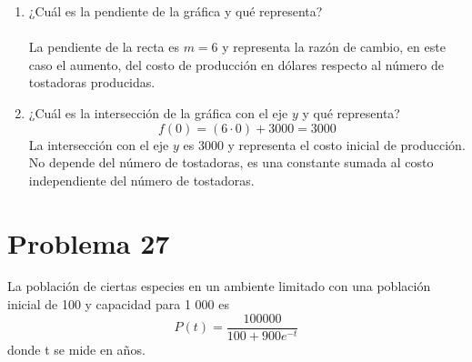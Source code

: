 \documentclass[12pt]{article}
\begin{document}
\begin{enumerate}
\item  ¿Cuál es la pendiente de la gráfica y qué representa?
\\ \\
La pendiente de la recta es $m=6$ y representa la razón de cambio, en este caso el aumento, del costo de producción en dólares respecto al número de tostadoras producidas.
\\  
\item  ¿Cuál es la intersección de la gráfica con el eje $y$ y qué representa?
\\
\[
f(0) = (6 \cdot 0) + 3000 = 3000
\]
La intersección con el eje $y$ es 3000 y representa el costo inicial de producción. No depende del número de tostadoras, es una constante sumada al costo independiente del número de tostadoras.
\\
\end{enumerate}

\clearpage
\section{Problema 27}
La población de ciertas especies en un ambiente limitado con una población inicial de 100 y capacidad para 1 000 es 
\[
P (t) = \frac{100 000}{100 + 900 e^{-t}} 
\]
donde t se mide en años.
\end{document}
